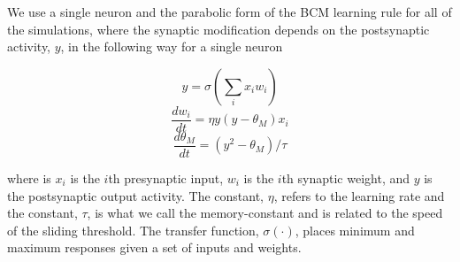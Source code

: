 \documentclass[
  letterpaper,
  number]{elsarticle}
\begin{document}
We use a single neuron and the parabolic form of the
BCM\citep{BCM82, Blais:2008kx} learning rule for all of the simulations,
where the synaptic modification depends on the postsynaptic activity,
\(y\), in the following way for a single neuron

\[
y=\sigma\left(\sum_i x_i w_i \right)
\] \[
\frac{dw_i}{dt} = \eta y(y-\theta_M) x_i
\] \[
\frac{d\theta_M}{dt} = (y^2-\theta_M)/\tau
\]

where is \(x_i\) is the \(i\)th presynaptic input, \(w_i\) is the
\(i\)th synaptic weight, and \(y\) is the postsynaptic output activity.
The constant, \(\eta\), refers to the learning rate and the constant,
\(\tau\), is what we call the memory-constant and is related to the
speed of the sliding threshold. The transfer function,
\(\sigma(\cdot)\), places minimum and maximum responses given a set of
inputs and weights.
\end{document}
